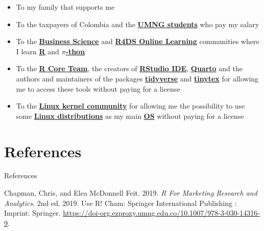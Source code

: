 \documentclass[
  ignorenonframetext,
]{beamer}
\newlength{\cslhangindent}
\newenvironment{CSLReferences}[2] %
 {\begin{list}{}{%
  \setlength{\itemindent}{0pt}
  \setlength{\leftmargin}{0pt}
  \setlength{\parsep}{0pt}
  \ifodd #1
   \setlength{\leftmargin}{\cslhangindent}
   \setlength{\itemindent}{-1\cslhangindent}
  \fi
  \setlength{\itemsep}{#2\baselineskip}}}
 {\end{list}}
\begin{document}
\begin{frame}{}
\label{section-21}
\begin{itemize}
\item
  To my family that supports me
\item
  To the taxpayers of Colombia and the
  \href{https://www.umng.edu.co/estudiante}{\textbf{UMNG students}} who
  pay my salary
\item
  To the \href{https://www.business-science.io/}{\textbf{Business
  Science}} and \href{https://www.rfordatasci.com/}{\textbf{R4DS Online
  Learning}} communities where I learn
  \href{https://www.r-project.org/about.html}{\textbf{R}} and
  \href{https://www.python.org/about/}{\textbf{\(\pi\)-thon}}
\item
  To the \href{https://www.r-project.org/contributors.html}{\textbf{R
  Core Team}}, the creators of
  \href{https://posit.co/products/open-source/rstudio/}{\textbf{RStudio
  IDE}}, \href{https://quarto.org/}{\textbf{Quarto}} and the authors and
  maintainers of the packages
  \href{https://CRAN.R-project.org/package=tidyverse}{\textbf{tidyverse}}
  and
  \href{https://CRAN.R-project.org/package=tinytex}{\textbf{tinytex}}
  for allowing me to access these tools without paying for a license
\item
  To the \href{https://www.kernel.org/category/about.html}{\textbf{Linux
  kernel community}} for allowing me the possibility to use some
  \href{https://static.lwn.net/Distributions/}{\textbf{Linux
  distributions}} as my main
  \href{https://en.wikipedia.org/wiki/Operating_system}{\textbf{OS}}
  without paying for a license
\end{itemize}
\end{frame}

\section*{References}\label{references}

\begin{frame}[allowframebreaks]{References}
\label{refs}
\begin{CSLReferences}{1}{0}
Chapman, Chris, and Elea McDonnell Feit. 2019. \emph{R {For} {Marketing}
{Research} and {Analytics}}. 2nd ed. 2019. Use {R}! Cham: Springer
International Publishing : Imprint: Springer.
\url{https://doi-org.ezproxy.umng.edu.co/10.1007/978-3-030-14316-9}.

\end{CSLReferences}
\end{frame}
\end{document}
